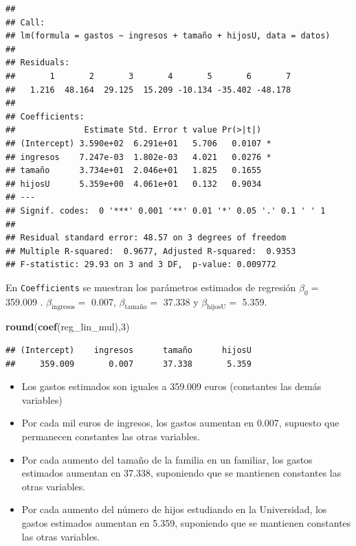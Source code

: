 \documentclass[]{book}
\newenvironment{Shaded}{\begin{snugshade}}{\end{snugshade}}
\newcommand{\KeywordTok}[1]{\textcolor[rgb]{0.13,0.29,0.53}{\textbf{#1}}}
\newcommand{\DecValTok}[1]{\textcolor[rgb]{0.00,0.00,0.81}{#1}}
\newcommand{\NormalTok}[1]{#1}
\providecommand{\tightlist}{%
  \setlength{\itemsep}{0pt}\setlength{\parskip}{0pt}}
\begin{document}
\begin{verbatim}
## 
## Call:
## lm(formula = gastos ~ ingresos + tamaño + hijosU, data = datos)
## 
## Residuals:
##       1       2       3       4       5       6       7 
##   1.216  48.164  29.125  15.209 -10.134 -35.402 -48.178 
## 
## Coefficients:
##              Estimate Std. Error t value Pr(>|t|)  
## (Intercept) 3.590e+02  6.291e+01   5.706   0.0107 *
## ingresos    7.247e-03  1.802e-03   4.021   0.0276 *
## tamaño      3.734e+01  2.046e+01   1.825   0.1655  
## hijosU      5.359e+00  4.061e+01   0.132   0.9034  
## ---
## Signif. codes:  0 '***' 0.001 '**' 0.01 '*' 0.05 '.' 0.1 ' ' 1
## 
## Residual standard error: 48.57 on 3 degrees of freedom
## Multiple R-squared:  0.9677, Adjusted R-squared:  0.9353 
## F-statistic: 29.93 on 3 and 3 DF,  p-value: 0.009772
\end{verbatim}

En \texttt{Coefficients} se muestran los parámetros estimados de
regresión \(\beta_0=\) 359.009 . \(\beta_{\mbox{ingresos}}=\) 0.007,
\(\beta_{\mbox{tamaño}}=\) 37.338 y \(\beta_{\mbox{hijosU}}=\) 5.359.

\begin{Shaded}
\begin{Highlighting}[]
\KeywordTok{round}\NormalTok{(}\KeywordTok{coef}\NormalTok{(reg_lin_mul),}\DecValTok{3}\NormalTok{)}
\end{Highlighting}
\end{Shaded}

\begin{verbatim}
## (Intercept)    ingresos      tamaño      hijosU 
##     359.009       0.007      37.338       5.359
\end{verbatim}

\begin{itemize}
\tightlist
\item
  Los gastos estimados son iguales a 359.009 euros (constantes las demás
  variables)
\item
  Por cada mil euros de ingresos, los gastos aumentan en 0.007, supuesto
  que permanecen constantes las otras variables.
\item
  Por cada aumento del tamaño de la familia en un familiar, los gastos
  estimados aumentan en 37.338, suponiendo que se mantienen constantes
  las otras variables.
\item
  Por cada aumento del número de hijos estudiando en la Universidad, los
  gastos estimados aumentan en 5.359, suponiendo que se mantienen
  constantes las otras variables.
\end{itemize}
\end{document}
